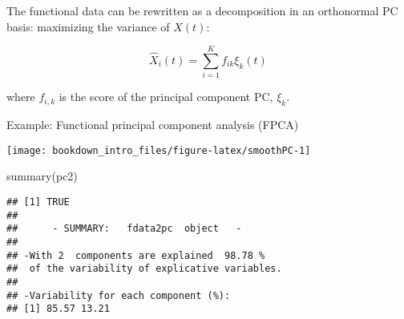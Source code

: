 \documentclass[
]{book}
\newenvironment{Shaded}{\begin{snugshade}}{\end{snugshade}}
\newcommand{\AttributeTok}[1]{\textcolor[rgb]{0.77,0.63,0.00}{#1}}
\newcommand{\DecValTok}[1]{\textcolor[rgb]{0.00,0.00,0.81}{#1}}
\newcommand{\FunctionTok}[1]{\textcolor[rgb]{0.00,0.00,0.00}{#1}}
\newcommand{\NormalTok}[1]{#1}
\newcommand{\OtherTok}[1]{\textcolor[rgb]{0.56,0.35,0.01}{#1}}
\newcommand{\SpecialCharTok}[1]{\textcolor[rgb]{0.00,0.00,0.00}{#1}}
\newcommand{\StringTok}[1]{\textcolor[rgb]{0.31,0.60,0.02}{#1}}
\begin{document}
The functional data can be rewritten as a decomposition in an orthonormal PC basis: maximizing the variance of \(X(t)\):

\[
\hat{X}_{i}(t)=\sum_{i=1}^{K}f_{ik}\xi_{k}(t)
\]

where \(f_{i,k}\) is the score of the principal component PC, \(\xi_k\).

Example: Functional principal component analysis (FPCA)

\begin{Shaded}
\end{Shaded}

\begin{center}\texttt{[image: bookdown\_intro\_files/figure-latex/smoothPC-1]} \end{center}

\begin{Shaded}
\begin{Highlighting}[]
\FunctionTok{summary}\NormalTok{(pc2)}
\end{Highlighting}
\end{Shaded}

\begin{verbatim}
## [1] TRUE
## 
##      - SUMMARY:   fdata2pc  object   -
## 
## -With 2  components are explained  98.78 %
##  of the variability of explicative variables.
##  
## -Variability for each component (%):
## [1] 85.57 13.21
\end{verbatim}
\end{document}
